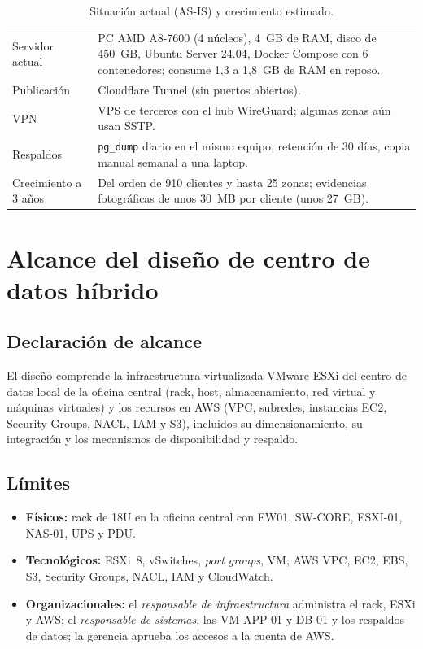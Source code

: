 \begin{table}[htbp]
\centering
\caption{Situación actual (AS-IS) y crecimiento estimado.}
\label{tab:ce03-asis-dc}
\small
\begin{tabularx}{\textwidth}{L{3.4cm}X}
\toprule
Servidor actual & PC AMD A8-7600 (4 núcleos), 4~GB de RAM, disco de 450~GB, Ubuntu Server 24.04, Docker Compose con 6 contenedores; consume 1,3 a 1,8~GB de RAM en reposo. \\
Publicación & Cloudflare Tunnel (sin puertos abiertos). \\
VPN & VPS de terceros con el hub WireGuard; algunas zonas aún usan SSTP. \\
Respaldos & \texttt{pg\_dump} diario en el mismo equipo, retención de 30 días, copia manual semanal a una laptop. \\
Crecimiento a 3 años & Del orden de 910 clientes y hasta 25 zonas; evidencias fotográficas de unos 30~MB por cliente (unos 27~GB). \\
\bottomrule
\end{tabularx}
\end{table}

\section{Alcance del diseño de centro de datos híbrido}

\subsection{Declaración de alcance}
El diseño comprende la infraestructura virtualizada VMware ESXi del centro de datos
local de la oficina central (rack, host, almacenamiento, red virtual y máquinas
virtuales) y los recursos en AWS (VPC, subredes, instancias EC2, Security Groups, NACL,
IAM y S3), incluidos su dimensionamiento, su integración y los mecanismos de
disponibilidad y respaldo.

\subsection{Límites}
\begin{itemize}
  \item \textbf{Físicos:} rack de 18U en la oficina central con FW01, SW-CORE, ESXI-01,
  NAS-01, UPS y PDU.
  \item \textbf{Tecnológicos:} ESXi~8, vSwitches, \emph{port groups}, VM; AWS VPC, EC2,
  EBS, S3, Security Groups, NACL, IAM y CloudWatch.
  \item \textbf{Organizacionales:} el \emph{responsable de infraestructura} administra
  el rack, ESXi y AWS; el \emph{responsable de sistemas}, las VM APP-01 y DB-01 y los
  respaldos de datos; la gerencia aprueba los accesos a la cuenta de AWS.
\end{itemize}

